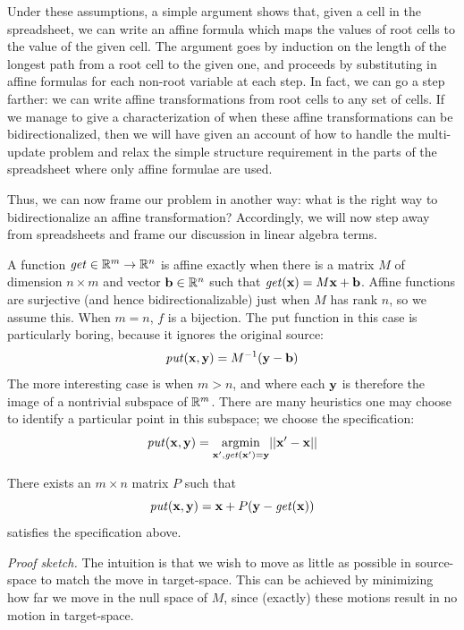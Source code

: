 Under these assumptions, a simple argument shows that, given a cell in the
spreadsheet, we can write an affine formula which maps the values of root
cells to the value of the given cell. The argument goes by induction on the
length of the longest path from a root cell to the given one, and proceeds
by substituting in affine formulas for each non-root variable at each step.
In fact, we can go a step farther: we can write affine transformations from
root cells to any set of cells. If we manage to give a characterization of
when these affine transformations can be bidirectionalized, then we will
have given an account of how to handle the multi-update problem and relax
the simple structure requirement in the parts of the spreadsheet where only
affine formulae are used.

Thus, we can now frame our problem in another way: what is the right way to
bidirectionalize an affine transformation? Accordingly, we will now step
away from spreadsheets and frame our discussion in linear algebra terms.

A function $\mathit{get} \in \mathbb R^m \to \mathbb R^n$ is affine exactly when there is a matrix
$M$ of dimension $n \times m$ and vector $\mathbf b \in \mathbb R^n$ such that $\mathit{get}(\mathbf x) =
M\mathbf x +\mathbf b$.  Affine functions are surjective (and hence bidirectionalizable)
just when $M$ has rank $n$, so we assume this. When $m=n$, $f$ is a
bijection. The put function in this case is particularly boring, because it
ignores the original source:
\[\mathit{put}(\mathbf x,\mathbf y) = M^{-1}(\mathbf y-\mathbf b)\]
The more interesting case is when $m>n$, and where each $\mathbf y$ is therefore
the image of a nontrivial subspace of $\mathbb R^m$. There are many heuristics one
may choose to identify a particular point in this subspace; we choose the
specification:
\[\mathit{put}(\mathbf x,\mathbf y) = \underset{\mathbf x',\mathit{get}(\mathbf x')=\mathbf y}{\operatorname{argmin}}||\mathbf x' - \mathbf x||\]

\begin{lemma}
    There exists an $m \times n$ matrix $P$ such that
    \[\mathit{put}(\mathbf x,\mathbf y) = \mathbf x + P(\mathbf y - \mathit{get}(\mathbf x))\]
    satisfies the specification above.
\end{lemma}
\emph{Proof sketch.} The intuition is that we wish to move as little as
possible in source-space to match the move in target-space. This can be
achieved by minimizing how far we move in the null space of $M$, since
(exactly) these motions result in no motion in target-space.

